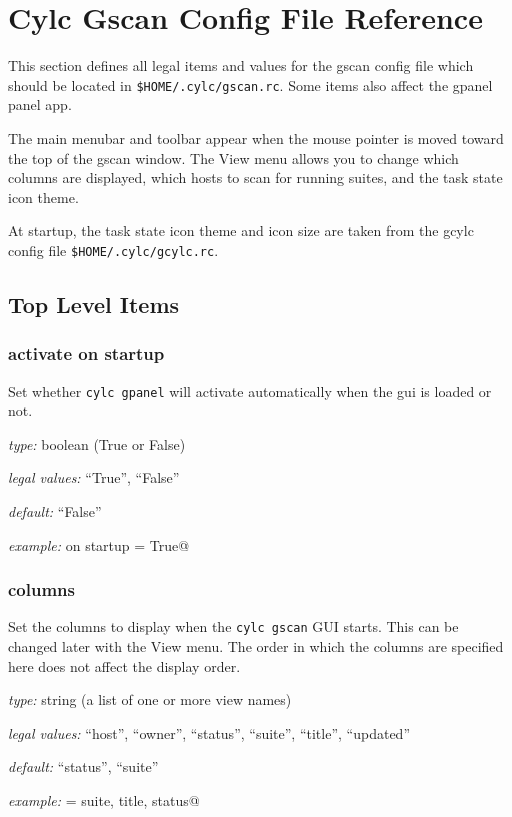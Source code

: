 
\section{Cylc Gscan Config File Reference}
\label{GscanRCReference}

\lstset{language=bash}

This section defines all legal items and values for the gscan config
file which should be located in \lstinline=$HOME/.cylc/gscan.rc=. Some items
also affect the gpanel panel app.

The main menubar and toolbar appear when the mouse pointer is moved toward the
top of the gscan window.  The View menu allows you to change which columns are
displayed, which hosts to scan for running suites, and the task state icon
theme.

At startup, the task state icon theme and icon size are taken from the gcylc
config file \lstinline=$HOME/.cylc/gcylc.rc=.


\subsection{Top Level Items}

\subsubsection{activate on startup}

Set whether \lstinline=cylc gpanel= will activate automatically when the gui is
loaded or not.

\begin{myitemize}
    \item {\em type:} boolean (True or False)
\item {\em legal values:} ``True'', ``False''
\item {\em default:} ``False''
\item {\em example:} \lstinline@activate on startup = True@
\end{myitemize}

\subsubsection{columns}

Set the columns to display when the \lstinline=cylc gscan= GUI starts. This can
be changed later with the View menu.  The order in which the columns are
specified here does not affect the display order.

\begin{myitemize}
\item {\em type:} string (a list of one or more view names)
\item {\em legal values:} ``host'', ``owner'', ``status'', ``suite'',
  ``title'', ``updated''
\item {\em default:} ``status'', ``suite''
\item {\em example:} \lstinline@columns = suite, title, status@
\end{myitemize}

